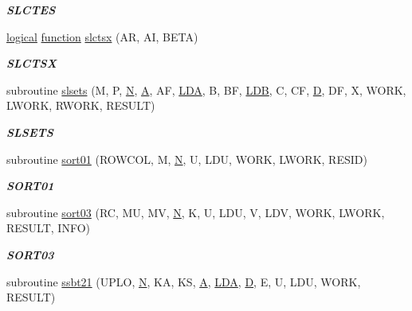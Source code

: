 \begin{DoxyCompactItemize}
\begin{DoxyCompactList}\small\item\em {\bfseries S\+L\+C\+T\+E\+S} \end{DoxyCompactList}\item 
\hyperlink{tnc_8c_aa7b64cdf39500931f7b333343791a104}{logical} \hyperlink{afunc_8m_a7b5e596df91eadea6c537c0825e894a7}{function} \hyperlink{group__single__eig_gabe65b08f429234a57b6b3253ec7da694}{slctsx} (A\+R, A\+I, B\+E\+T\+A)
\begin{DoxyCompactList}\small\item\em {\bfseries S\+L\+C\+T\+S\+X} \end{DoxyCompactList}\item 
subroutine \hyperlink{group__single__eig_ga20ea4c39bd0bee5f869b9f9131c0c53d}{slsets} (M, P, \hyperlink{polmisc_8c_a0240ac851181b84ac374872dc5434ee4}{N}, \hyperlink{classA}{A}, A\+F, \hyperlink{example__user_8c_ae946da542ce0db94dced19b2ecefd1aa}{L\+D\+A}, B, B\+F, \hyperlink{example__user_8c_a50e90a7104df172b5a89a06c47fcca04}{L\+D\+B}, C, C\+F, \hyperlink{odrpack_8h_a7dae6ea403d00f3687f24a874e67d139}{D}, D\+F, X, W\+O\+R\+K, L\+W\+O\+R\+K, R\+W\+O\+R\+K, R\+E\+S\+U\+L\+T)
\begin{DoxyCompactList}\small\item\em {\bfseries S\+L\+S\+E\+T\+S} \end{DoxyCompactList}\item 
subroutine \hyperlink{group__single__eig_ga117c87e8771c05b0d10909b2a7176979}{sort01} (R\+O\+W\+C\+O\+L, M, \hyperlink{polmisc_8c_a0240ac851181b84ac374872dc5434ee4}{N}, U, L\+D\+U, W\+O\+R\+K, L\+W\+O\+R\+K, R\+E\+S\+I\+D)
\begin{DoxyCompactList}\small\item\em {\bfseries S\+O\+R\+T01} \end{DoxyCompactList}\item 
subroutine \hyperlink{group__single__eig_gacdb40a265d764f2ce962040de230c2f1}{sort03} (R\+C, M\+U, M\+V, \hyperlink{polmisc_8c_a0240ac851181b84ac374872dc5434ee4}{N}, K, U, L\+D\+U, V, L\+D\+V, W\+O\+R\+K, L\+W\+O\+R\+K, R\+E\+S\+U\+L\+T, I\+N\+F\+O)
\begin{DoxyCompactList}\small\item\em {\bfseries S\+O\+R\+T03} \end{DoxyCompactList}\item 
subroutine \hyperlink{group__single__eig_gaf79abbc26c3852094a0788e7a5a67daf}{ssbt21} (U\+P\+L\+O, \hyperlink{polmisc_8c_a0240ac851181b84ac374872dc5434ee4}{N}, K\+A, K\+S, \hyperlink{classA}{A}, \hyperlink{example__user_8c_ae946da542ce0db94dced19b2ecefd1aa}{L\+D\+A}, \hyperlink{odrpack_8h_a7dae6ea403d00f3687f24a874e67d139}{D}, E, U, L\+D\+U, W\+O\+R\+K, R\+E\+S\+U\+L\+T)

\end{DoxyCompactItemize}
